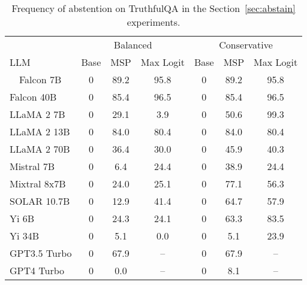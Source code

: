 \begin{table*}[h]
\centering
\caption{Frequency of abstention on TruthfulQA in the Section~\ref{sec:abstain} experiments.}
\label{tab:truthfulqa_pct_abstained}
\begin{tabular}{lcccccc}
\toprule
& \multicolumn{3}{c}{Balanced} & \multicolumn{3}{c}{Conservative} \\ 
LLM & Base & MSP & Max Logit & Base & MSP & Max Logit \\ 
\cmidrule(lr){1-1}\cmidrule(lr){2-4}\cmidrule(lr){5-7}\ \ 
Falcon 7B & 0 & 89.2 & 95.8 & 0 & 89.2 & 95.8\\
Falcon 40B & 0 & 85.4 & 96.5 & 0 & 85.4 & 96.5\\
LLaMA 2 7B & 0 & 29.1 & 3.9 & 0 & 50.6 & 99.3\\
LLaMA 2 13B & 0 & 84.0 & 80.4 & 0 & 84.0 & 80.4\\
LLaMA 2 70B & 0 & 36.4 & 30.0 & 0 & 45.9 & 40.3\\
Mistral 7B & 0 & 6.4 & 24.4 & 0 & 38.9 & 24.4\\
Mixtral 8x7B & 0 & 24.0 & 25.1 & 0 & 77.1 & 56.3\\
SOLAR 10.7B & 0 & 12.9 & 41.4 & 0 & 64.7 & 57.9\\
Yi 6B & 0 & 24.3 & 24.1 & 0 & 63.3 & 83.5\\
Yi 34B & 0 & 5.1 & 0.0 & 0 & 5.1 & 23.9\\
GPT3.5 Turbo & 0 & 67.9 & -- & 0 & 67.9 & --\\
GPT4 Turbo & 0 & 0.0 & -- & 0 & 8.1 & --\\
\bottomrule
\end{tabular}
\end{table*}
